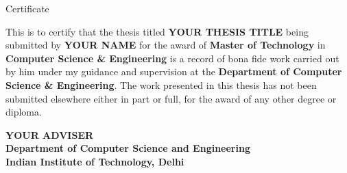 \begin{center}
\LARGE{ Certificate} 
\end{center}

\vspace{0.5in}

This is to certify that the thesis titled {\bfseries YOUR THESIS TITLE} being submitted by
{\bfseries YOUR NAME} for the award of {\bfseries Master of Technology} in {\bfseries Computer Science \& Engineering} is a record of bona fide work carried out by him under my guidance and supervision at the {\bfseries Department of Computer Science \& Engineering}. The work presented in this thesis has not been submitted elsewhere either in part or full, for the award of any other degree or diploma.

\vspace{1.5in}


{\bfseries YOUR ADVISER} \\
{\bfseries Department of Computer Science and Engineering} \\
{\bfseries Indian Institute of Technology, Delhi}\\ 
